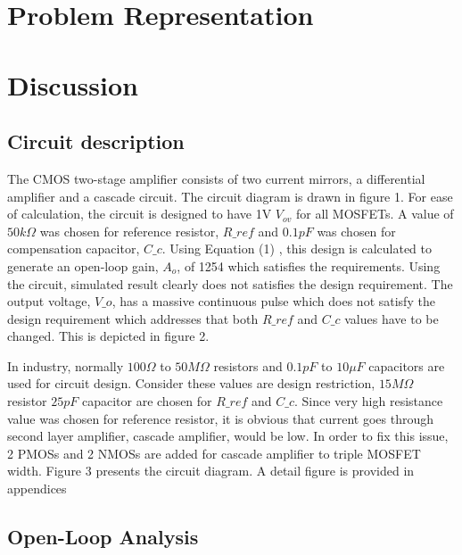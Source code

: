 \documentclass[conference,compsoc]{IEEEtran}
\begin{document}
\section{Problem Representation}



\section{Discussion}
\subsection{Circuit description}
The CMOS two-stage amplifier consists of two current
mirrors, a differential amplifier and a cascade circuit. The circuit diagram is drawn in figure 1. For ease of calculation, the circuit is designed to have 1V \(V_{ov}\) for all MOSFETs.  A value of \(50 k\Omega\) was chosen for reference resistor, \(R\_ref\) and \(0.1 pF\) was chosen for compensation capacitor, \(C\_c\). Using Equation (1) , this design is calculated to generate an open-loop gain, \(A_o\), of 1254 which satisfies the requirements. Using the circuit, simulated result clearly does not satisfies the design requirement. The output voltage, \(V\_o\), has a massive continuous pulse which does not satisfy the design requirement which addresses that both \(R\_ref\) and \(C\_c\) values have to be changed. This is depicted in figure 2.

In industry, normally \(100\Omega\) to \(50M\Omega\) resistors and \(0.1pF\) to \(10\mu F\) capacitors are used for circuit design. Consider these values are design restriction, \(15M\Omega\) resistor \(25pF\) capacitor are chosen for \(R\_ref\) and \(C\_c\). Since very high resistance value was chosen for reference resistor, it is obvious that current goes through second layer amplifier, cascade amplifier, would be low. In order to fix this issue, 2 PMOSs and 2 NMOSs are added for cascade amplifier to triple MOSFET width. Figure 3 presents the circuit diagram. A detail figure is provided in appendices\\


\subsection{Open-Loop Analysis}
\end{document}

